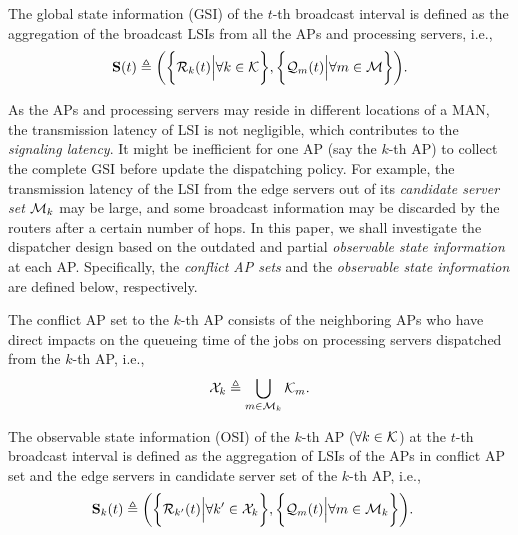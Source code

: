 \begin{definition}
    The global state information (GSI) of the $t$-th broadcast interval is defined as the aggregation of the broadcast LSIs from all the APs and processing servers, i.e.,
    {\small
    \begin{align}
        \mathbf{S}(t) \triangleq
            \bigg(
                \bigg\{\mathcal{R}_{k}(t) \Big| \forall k\in\mathcal{K}\bigg\},
                \bigg\{\mathcal{Q}_{m}(t) \Big| \forall m\in\mathcal{M}\bigg\}
            \bigg).
    \end{align}
    }%
\end{definition}

As the APs and processing servers may reside in different locations of a MAN, the transmission latency of LSI is not negligible, which contributes to the \emph{signaling latency}.
It might be inefficient for one AP (say the $k$-th AP) to collect the complete GSI before update the dispatching policy.
For example, the transmission latency of the LSI from the edge servers out of its \emph{candidate server set} $\mathcal{M}_{k}$ may be large, and some broadcast information may be discarded by the routers after a certain number of hops.
In this paper, we shall investigate the dispatcher design based on the outdated and partial \emph{observable state information} at each AP.
Specifically, the \emph{conflict AP sets} and the \emph{observable state information} are defined below, respectively.
\begin{definition}
    The conflict AP set to the $k$-th AP consists of the neighboring APs who have direct impacts on the queueing time of the jobs on processing servers dispatched from the $k$-th AP, i.e.,
    {\small
    \begin{align}
        \mathcal{X}_{k} \triangleq \bigcup_{m\in\mathcal{M}_{k}} \mathcal{K}_{m}.
    \end{align}
    }%
\end{definition}

\begin{definition}
    The observable state information (OSI) of the $k$-th AP ($\forall k\in\mathcal{K}$) at the $t$-th broadcast interval is defined as the aggregation of LSIs of the APs in {conflict AP set} and the edge servers in {candidate server set} of the $k$-th AP, i.e.,
    {\small
    \begin{align}
        \mathbf{S}_{k}(t) &\triangleq
        \bigg(
            \bigg\{\mathcal{R}_{k'}(t) \Big| \forall k'\in\mathcal{X}_{k}\bigg\},
            \bigg\{\mathcal{Q}_{m}(t) \Big| \forall m\in\mathcal{M}_{k}\bigg\}
        \bigg).
    \end{align}
    }%
    \label{def:OSI}
\end{definition}

